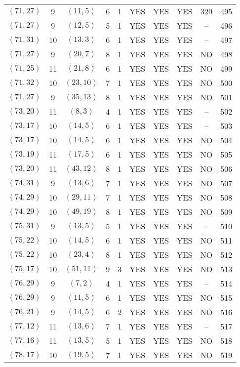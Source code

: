 \begin{longtable}{|c|c|c|c|c|c|c|c|c|c|}
$(71, 27)$ & 9 & $(11, 5)$ & 6 & 1 & YES & YES & YES & 320 & 495\\
$(71, 27)$ & 9 & $(12, 5)$ & 5 & 1 & YES & YES & YES & -- & 496\\
$(71, 31)$ & 10 & $(13, 3)$ & 6 & 1 & YES & YES & YES & -- & 497\\
$(71, 27)$ & 9 & $(20, 7)$ & 8 & 1 & YES & YES & YES & NO & 498\\
$(71, 25)$ & 11 & $(21, 8)$ & 6 & 1 & YES & YES & YES & NO & 499\\
$(71, 32)$ & 10 & $(23, 10)$ & 7 & 1 & YES & YES & YES & NO & 500\\
$(71, 27)$ & 9 & $(35, 13)$ & 8 & 1 & YES & YES & YES & NO & 501\\
$(73, 20)$ & 11 & $(8, 3)$ & 4 & 1 & YES & YES & YES & -- & 502\\
$(73, 17)$ & 10 & $(14, 5)$ & 6 & 1 & YES & YES & YES & -- & 503\\
$(73, 17)$ & 10 & $(14, 5)$ & 6 & 1 & YES & YES & YES & NO & 504\\
$(73, 19)$ & 11 & $(17, 5)$ & 6 & 1 & YES & YES & YES & NO & 505\\
$(73, 20)$ & 11 & $(43, 12)$ & 8 & 1 & YES & YES & YES & NO & 506\\
$(74, 31)$ & 9 & $(13, 6)$ & 7 & 1 & YES & YES & YES & NO & 507\\
$(74, 29)$ & 10 & $(29, 11)$ & 7 & 1 & YES & YES & YES & NO & 508\\
$(74, 29)$ & 10 & $(49, 19)$ & 8 & 1 & YES & YES & YES & NO & 509\\
$(75, 31)$ & 9 & $(13, 5)$ & 5 & 1 & YES & YES & YES & -- & 510\\
$(75, 22)$ & 10 & $(14, 5)$ & 6 & 1 & YES & YES & YES & NO & 511\\
$(75, 22)$ & 10 & $(23, 4)$ & 8 & 1 & YES & YES & YES & NO & 512\\
$(75, 17)$ & 10 & $(51, 11)$ & 9 & 3 & YES & YES & YES & NO & 513\\
$(76, 29)$ & 9 & $(7, 2)$ & 4 & 1 & YES & YES & YES & -- & 514\\
$(76, 29)$ & 9 & $(11, 5)$ & 6 & 1 & YES & YES & YES & NO & 515\\
$(76, 21)$ & 9 & $(14, 5)$ & 6 & 2 & YES & YES & YES & NO & 516\\
$(77, 12)$ & 11 & $(13, 6)$ & 7 & 1 & YES & YES & YES & -- & 517\\
$(77, 16)$ & 11 & $(13, 5)$ & 5 & 1 & YES & YES & YES & NO & 518\\
$(78, 17)$ & 10 & $(19, 5)$ & 7 & 1 & YES & YES & YES & NO & 519\\

\end{longtable}
